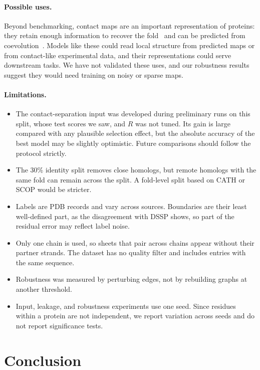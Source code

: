\documentclass[pdflatex,sn-mathphys-num]{sn-jnl}
\begin{document}
\paragraph{Possible uses.} Beyond benchmarking, contact maps are an important representation of proteins: they retain enough information to recover the fold~\cite{vendruscolo1997recovery} and can be predicted from coevolution~\cite{morcos2011direct}. Models like these could read local structure from predicted maps or from contact-like experimental data, and their representations could serve downstream tasks. We have not validated these uses, and our robustness results suggest they would need training on noisy or sparse maps.

\paragraph{Limitations.}
\begin{itemize}
    \item The contact-separation input was developed during preliminary runs on this split, whose test scores we saw, and $R$ was not tuned. Its gain is large compared with any plausible selection effect, but the absolute accuracy of the best model may be slightly optimistic. Future comparisons should follow the protocol strictly.
    \item The 30\% identity split removes close homologs, but remote homologs with the same fold can remain across the split. A fold-level split based on CATH or SCOP would be stricter.
    \item Labels are PDB records and vary across sources. Boundaries are their least well-defined part, as the disagreement with DSSP shows, so part of the residual error may reflect label noise.
    \item Only one chain is used, so sheets that pair across chains appear without their partner strands. The dataset has no quality filter and includes entries with the same sequence.
    \item Robustness was measured by perturbing edges, not by rebuilding graphs at another threshold.
    \item Input, leakage, and robustness experiments use one seed. Since residues within a protein are not independent, we report variation across seeds and do not report significance tests.
\end{itemize}

\section{Conclusion}\label{sec:conclusion}
\end{document}

